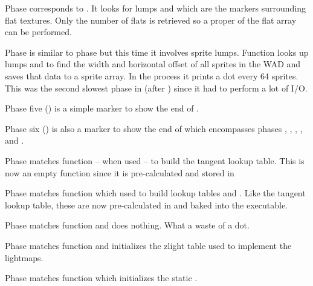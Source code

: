 Phase  corresponds to . It looks for lumps  and  which are the markers surrounding flat textures. Only the number of flats is retrieved so a proper  of the flat array can be performed.\\
\par

Phase  is similar to phase  but this time it involves sprite lumps. Function  looks up lumps  and  to find the width and horizontal offset of all sprites in the WAD and saves that data to a sprite array. In the process it prints a dot every 64 sprites. This was the second slowest phase in  (after ) since it had to perform a lot of I/O.\\
\par

Phase five () is a simple marker to show the end of .\\
\par

Phase six () is also a marker to show the end of  which encompasses phases , , , , and .\\
\par

Phase  matches function  -- when used -- to build the tangent lookup table. This is now an empty function since it is pre-calculated and stored in \\
\par

Phase  matches function  which used to build lookup tables  and . Like the tangent lookup table, these are now pre-calculated in  and baked into the executable.\\
\par

Phase  matches function  and does nothing. What a waste of a dot.\\
\par

Phase  matches function  and initializes the zlight table used to implement the lightmaps.\\
\par

Phase  matches function  which initializes the static .\\
\par
